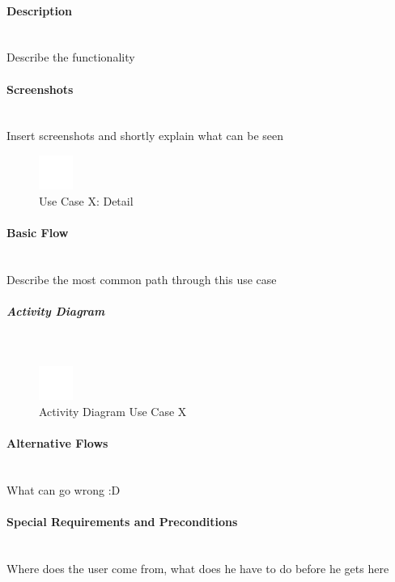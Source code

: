 \paragraph*{Description}\mbox{}\\
Describe the functionality

\paragraph*{Screenshots}\mbox{}\\
Insert screenshots and shortly explain what can be seen
\begin{figure}[h] 
	\centering
	\includegraphics[width=0.1\textwidth]{Content/Domain/placeholder.png}
	\caption{Use Case X: Detail}
	\label{fig:label4}
\end{figure}

\paragraph*{Basic Flow} \mbox{}\\

Describe the most common path through this use case

\subparagraph{Activity Diagram}\mbox{}\\
\begin{figure}[h]
	\centering
	\includegraphics[width=0.1\textwidth]{Content/Domain/placeholder.png}
	\caption{Activity Diagram Use Case X}
	\label{fig:label44}
\end{figure}

\paragraph*{Alternative Flows}\mbox{}\\
What can go wrong :D

\paragraph*{Special Requirements and Preconditions}\mbox{}\\
Where does the user come from, what does he have to do before he gets here

